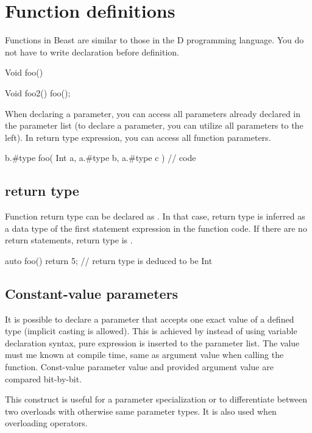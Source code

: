 \section{Function definitions}
Functions in Beast are similar to those in the D programming language. You do not have to write declaration before definition.

\begin{code}
Void foo() {}

Void foo2() {
	foo();
}
\end{code}

When declaring a parameter, you can access all parameters already declared in the parameter list (to declare a parameter, you can utilize all parameters to the left). In return type expression, you can access all function parameters.

\begin{code}
b.#type foo( Int a, a.#type b, a.#type c ) {
	// code
}
\end{code}

\subsection{ return type}
Function return type can be declared as . In that case, return type is inferred as a data type of the first  statement expression in the function code. If there are no return statements, return type is .

\begin{code}
auto foo() {
	return 5; // return type is deduced to be Int
}
\end{code}

\subsection{Constant-value parameters}
It is possible to declare a parameter that accepts one exact value of a defined type (implicit casting is allowed). This is achieved by instead of using variable declaration syntax, pure expression is inserted to the parameter list. The value must me known at compile time, same as argument value when calling the function. Const-value parameter value and provided argument value are compared bit-by-bit. 

This construct is useful for a \ctime parameter specialization or to differentiate between two overloads with otherwise same parameter types. It is also used when overloading operators.

